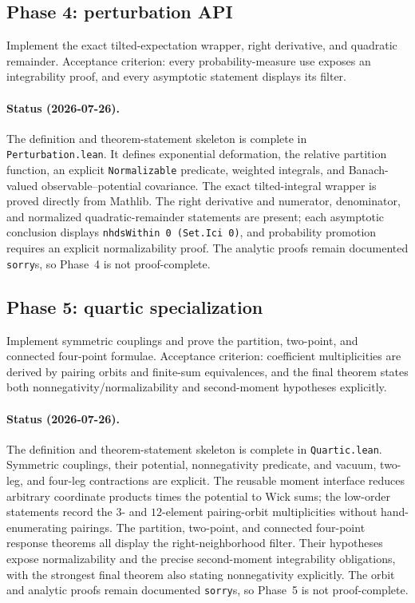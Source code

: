 \subsection*{Phase 4: perturbation API}
Implement the exact tilted-expectation wrapper, right derivative, and quadratic remainder.
Acceptance criterion: every probability-measure use exposes an integrability proof, and every
asymptotic statement displays its filter.

\paragraph{Status (2026-07-26).}
The definition and theorem-statement skeleton is complete in \texttt{Perturbation.lean}.  It
defines exponential deformation, the relative partition function, an explicit
\texttt{Normalizable} predicate, weighted integrals, and Banach-valued observable--potential
covariance.  The exact tilted-integral wrapper is proved directly from Mathlib.  The right
derivative and numerator, denominator, and normalized quadratic-remainder statements are present;
each asymptotic conclusion displays \texttt{nhdsWithin 0 (Set.Ici 0)}, and probability promotion
requires an explicit normalizability proof.  The analytic proofs remain documented
\texttt{sorry}s, so Phase~4 is not proof-complete.

\subsection*{Phase 5: quartic specialization}
Implement symmetric couplings and prove the partition, two-point, and connected four-point
formulae.  Acceptance criterion: coefficient multiplicities are derived by pairing orbits and
finite-sum equivalences, and the final theorem states both nonnegativity/normalizability and
second-moment hypotheses explicitly.

\paragraph{Status (2026-07-26).}
The definition and theorem-statement skeleton is complete in \texttt{Quartic.lean}.  Symmetric
couplings, their potential, nonnegativity predicate, and vacuum, two-leg, and four-leg contractions
are explicit.  The reusable moment interface reduces arbitrary coordinate products times the
potential to Wick sums; the low-order statements record the $3$- and $12$-element pairing-orbit
multiplicities without hand-enumerating pairings.  The partition, two-point, and connected
four-point response theorems all display the right-neighborhood filter.  Their hypotheses expose
normalizability and the precise second-moment integrability obligations, with the strongest final
theorem also stating nonnegativity explicitly.  The orbit and analytic proofs remain documented
\texttt{sorry}s, so Phase~5 is not proof-complete.

